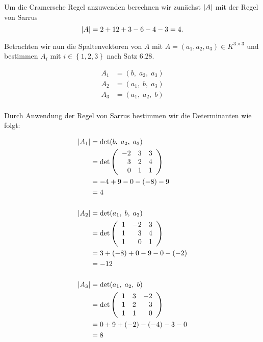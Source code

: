 \documentclass[main.tex]{subfiles}
\begin{document}
Um die Cramersche Regel anzuwenden berechnen wir zunächst $\abs{A}$ mit der Regel von Sarrus
$$
    \abs{A} = 2 + 12 + 3 -6 -4 -3 = 4.
$$

Betrachten wir nun die Spaltenvektoren von $A$ mit $A=(a_1, a_2, a_3) \in K^{3\times 3}$ und bestimmen $A_i$ mit $i\in \left\{1, 2, 3\right\}$ nach Satz 6.28.

\begin{align*}
    A_1 &= (  b, \; a_2, \; a_3) \\
    A_2 &= (a_1, \;   b, \; a_3) \\
    A_3 &= (a_1, \; a_2, \; b) \\
\end{align*}

Durch Anwendung der Regel von Sarrus bestimmen wir die Determinanten wie folgt:


\begin{align*}
    \abs{A_1} &= \det (  b, \; a_2, \; a_3) \\
              &= \det \eqmatrix{rrr}{
                -2 & 3 & 3 \\
                 3 & 2 & 4 \\
                 0 & 1 & 1 \\
              } \\
              &= -4 + 9 -0 - (-8) -9 \\
              &= 4 \\[5mm]
    \abs{A_2} &= \det (a_1, \;   b, \; a_3) \\
              &= \det \eqmatrix{rrr}{
                1 & -2 & 3 \\
                1 &  3 & 4 \\
                1 &  0 & 1 \\
              } \\
              &= 3 + (-8) + 0 -9 -0 -(-2) \\
              &= -12 \\[5mm]
    \abs{A_3} &= \det (a_1, \; a_2, \; b) \\
              &= \det \eqmatrix{rrr}{
                1 & 3 & -2 \\
                1 & 2 &  3 \\
                1 & 1 &  0 \\
              } \\
              &= 0 + 9 + (-2) - (-4) -3 -0 \\
              &= 8
\end{align*}
\end{document}
